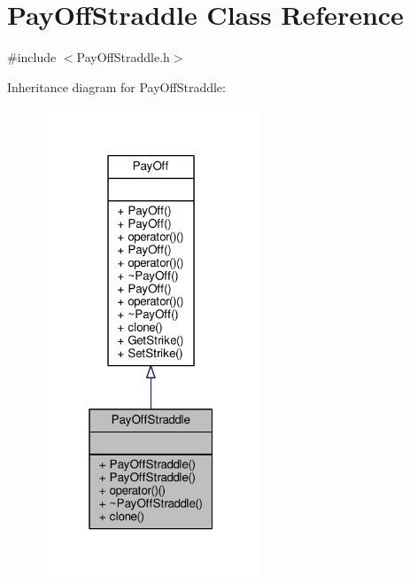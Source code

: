 \hypertarget{classPayOffStraddle}{}\section{Pay\+Off\+Straddle Class Reference}
\label{classPayOffStraddle}


{\ttfamily \#include $<$Pay\+Off\+Straddle.\+h$>$}



Inheritance diagram for Pay\+Off\+Straddle\+:
\nopagebreak
\begin{figure}[H]
\begin{center}
\leavevmode
\includegraphics[width=184pt]{classPayOffStraddle__inherit__graph}
\end{center}
\end{figure}


